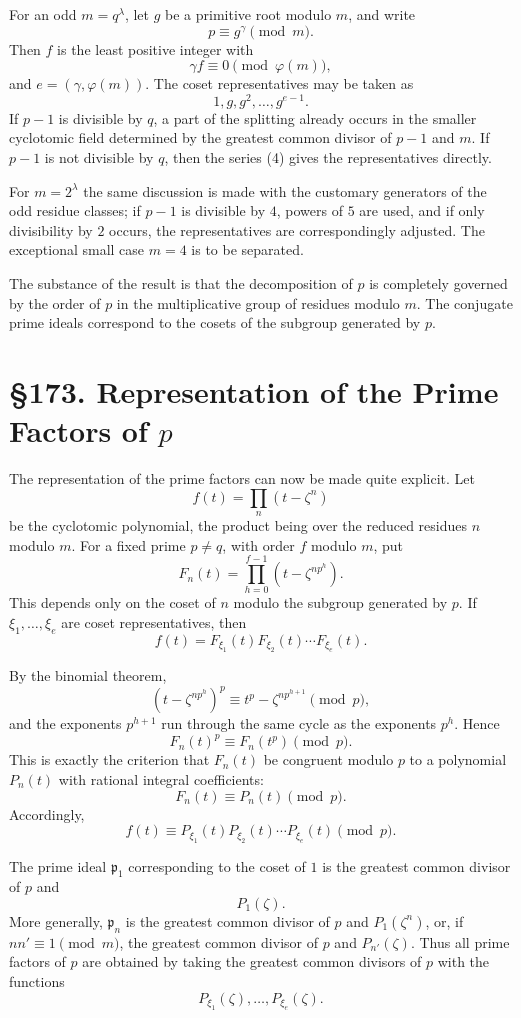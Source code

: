 \documentclass[11pt,a4paper]{book}
\newcommand{\webersection}[2]{\clearpage\section*{\S #1. #2}}
\newcommand{\p}{\mathfrak p}
\begin{document}
For an odd \(m=q^\lambda\), let \(g\) be a primitive root modulo \(m\), and write
\[
  p\equiv g^\gamma\pmod m.
\]
Then \(f\) is the least positive integer with
\[
  \gamma f\equiv0\pmod{\varphi(m)},
\]
and \(e=(\gamma,\varphi(m))\).  The coset representatives may be taken as
\[
  1,g,g^2,\ldots,g^{e-1}.
\tag{4}
\]
If \(p-1\) is divisible by \(q\), a part of the splitting already occurs in the smaller cyclotomic field determined by the greatest common divisor of \(p-1\) and \(m\).  If \(p-1\) is not divisible by \(q\), then the series (4) gives the representatives directly.

For \(m=2^\lambda\) the same discussion is made with the customary generators of the odd residue classes; if \(p-1\) is divisible by \(4\), powers of \(5\) are used, and if only divisibility by \(2\) occurs, the representatives are correspondingly adjusted.  The exceptional small case \(m=4\) is to be separated.

The substance of the result is that the decomposition of \(p\) is completely governed by the order of \(p\) in the multiplicative group of residues modulo \(m\).  The conjugate prime ideals correspond to the cosets of the subgroup generated by \(p\).

\webersection{173}{Representation of the Prime Factors of \(p\)}

The representation of the prime factors can now be made quite explicit.  Let
\[
  f(t)=\prod_n(t-\zeta^n)
\]
be the cyclotomic polynomial, the product being over the reduced residues \(n\) modulo \(m\).  For a fixed prime \(p\ne q\), with order \(f\) modulo \(m\), put
\[
  F_n(t)=\prod_{h=0}^{f-1}(t-\zeta^{np^h}).
\tag{1}
\]
This depends only on the coset of \(n\) modulo the subgroup generated by \(p\).  If \(\xi_1,\ldots,\xi_e\) are coset representatives, then
\[
  f(t)=F_{\xi_1}(t)F_{\xi_2}(t)\cdots F_{\xi_e}(t).
\tag{2}
\]

By the binomial theorem,
\[
  (t-\zeta^{np^h})^p\equiv t^p-\zeta^{np^{h+1}}\pmod p,
\]
and the exponents \(p^{h+1}\) run through the same cycle as the exponents \(p^h\).  Hence
\[
  F_n(t)^p\equiv F_n(t^p)\pmod p.
\tag{3}
\]
This is exactly the criterion that \(F_n(t)\) be congruent modulo \(p\) to a polynomial \(P_n(t)\) with rational integral coefficients:
\[
  F_n(t)\equiv P_n(t)\pmod p.
\tag{4}
\]
Accordingly,
\[
  f(t)\equiv P_{\xi_1}(t)P_{\xi_2}(t)\cdots P_{\xi_e}(t)\pmod p.
\tag{5}
\]

The prime ideal \(\p_1\) corresponding to the coset of \(1\) is the greatest common divisor of \(p\) and
\[
  P_1(\zeta).
\tag{6}
\]
More generally, \(\p_n\) is the greatest common divisor of \(p\) and \(P_1(\zeta^n)\), or, if \(nn'\equiv1\pmod m\), the greatest common divisor of \(p\) and \(P_{n'}(\zeta)\).  Thus all prime factors of \(p\) are obtained by taking the greatest common divisors of \(p\) with the functions
\[
  P_{\xi_1}(\zeta),\ldots,P_{\xi_e}(\zeta).
\tag{7}
\]
\end{document}
